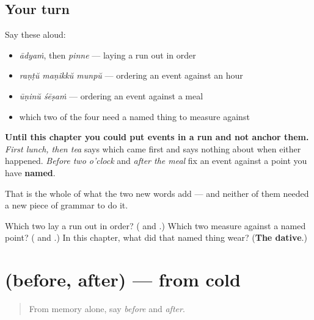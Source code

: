 \subsection*{Your turn}
Say these aloud:

\begin{itemize}
\raggedright
  \item \emph{ādyaṁ}, then \emph{pinne} — laying a run out in order
  \item \emph{raṇṭŭ maṇikkŭ munpŭ} — ordering an event against an hour
  \item \emph{ūṇinŭ śēṣaṁ} — ordering an event against a meal
  \item which two of the four need a named thing to measure against
\end{itemize}

\begin{grammarlens}[title={What you've built}]
\textbf{Until this chapter you could put events in a run and not anchor them.} \emph{First lunch, then tea} says which came first and says nothing about when either happened. \emph{Before two o'clock} and \emph{after the meal} fix an event against a point you have \textbf{named}.

That is the whole of what the two new words add — and neither of them needed a new piece of grammar to do it.
\end{grammarlens}

\begin{tcolorbox}[breakable,colback=teal!4,colframe=teal!35!black,title={Before you move on}]
Which two lay a run out in order? (\textbf{} and \textbf{}.) Which two measure against a named point? (\textbf{} and \textbf{}.) In this chapter, what did that named thing wear? (\textbf{The dative}.)
\end{tcolorbox}
\section[(before, after)]{(before, after) — from cold}

\label{lesson:ML-R106-before-after-recall}



\begin{quote}
From memory alone, say \emph{before} and \emph{after}.
\end{quote}

